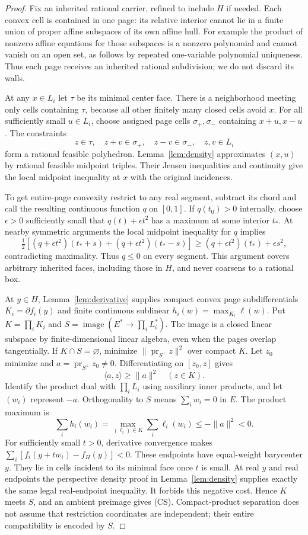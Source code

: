 \documentclass[11pt]{article}
\begin{document}
\begin{proof}
Fix an inherited rational carrier, refined to include $H$ if needed. Each convex cell is contained in one page: its relative interior cannot lie in a finite union of proper affine subspaces of its own affine hull. For example the product of nonzero affine equations for those subspaces is a nonzero polynomial and cannot vanish on an open set, as follows by repeated one-variable polynomial uniqueness. Thus each page receives an inherited rational subdivision; we do not discard its walls.

At any $x\in L_i$ let $\tau$ be its minimal center face. There is a neighborhood meeting only cells containing $\tau$, because all other finitely many closed cells avoid $x$. For all sufficiently small $u\in L_i$, choose assigned page cells $\sigma_+,\sigma_-$ containing $x+u,x-u$. The constraints
\[
 z\in\tau,\quad z+v\in\sigma_+,\quad z-v\in\sigma_-,\quad z,v\in L_i
\]
form a rational feasible polyhedron. Lemma~\ref{lem:density} approximates $(x,u)$ by rational feasible midpoint triples. Their Jensen inequalities and continuity give the local midpoint inequality at $x$ with the original incidences.

To get entire-page convexity restrict to any real segment, subtract its chord and call the resulting continuous function $q$ on $[0,1]$. If $q(t_0)>0$ internally, choose $\epsilon>0$ sufficiently small that $q(t)+\epsilon t^2$ has a maximum at some interior $t_*$. At nearby symmetric arguments the local midpoint inequality for $q$ implies
\[
 \tfrac12[(q+\epsilon t^2)(t_*+s)+(q+\epsilon t^2)(t_*-s)]
 \geq(q+\epsilon t^2)(t_*)+\epsilon s^2,
\]
contradicting maximality. Thus $q\leq0$ on every segment. This argument covers arbitrary inherited faces, including those in $H$, and never coarsens to a rational box.

At $y\in H$, Lemma~\ref{lem:derivative} supplies compact convex page subdifferentials $K_i=\partial f_i(y)$ and finite continuous sublinear $h_i(w)=\max_{K_i}\ell(w)$. Put $K=\prod_iK_i$ and $S=\operatorname{image}(E^*\to\prod_iL_i^*)$. The image is a closed linear subspace by finite-dimensional linear algebra, even when the pages overlap tangentially. If $K\cap S=\varnothing$, minimize $\|\operatorname{pr}_{S^\perp}z\|^2$ over compact $K$. Let $z_0$ minimize and $a=\operatorname{pr}_{S^\perp}z_0\ne0$. Differentiating on $[z_0,z]$ gives
\[
 \langle a,z\rangle\geq\|a\|^2\quad(z\in K).
\]
Identify the product dual with $\prod_iL_i$ using auxiliary inner products, and let $(w_i)$ represent $-a$. Orthogonality to $S$ means $\sum_iw_i=0$ in $E$. The product maximum is
\[
 \sum_ih_i(w_i)=\max_{(\ell_i)\in K}\sum_i\ell_i(w_i)
 \leq-\|a\|^2<0.
\]
For sufficiently small $t>0$, derivative convergence makes
$\sum_i[f_i(y+tw_i)-f_H(y)]<0$. These endpoints have equal-weight barycenter $y$. They lie in cells incident to its minimal face once $t$ is small. At real $y$ and real endpoints the perspective density proof in Lemma~\ref{lem:density} supplies exactly the same legal real-endpoint inequality. It forbids this negative cost. Hence $K$ meets $S$, and an ambient preimage gives (CS). Compact-product separation does not assume that restriction coordinates are independent; their entire compatibility is encoded by $S$.


\end{proof}
\end{document}

